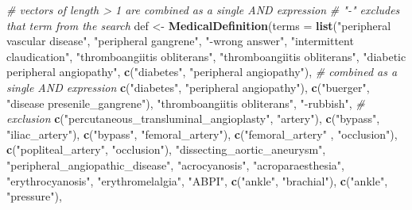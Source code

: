 \documentclass[]{article}
\newenvironment{Shaded}{\begin{snugshade}}{\end{snugshade}}
\newcommand{\KeywordTok}[1]{\textcolor[rgb]{0.13,0.29,0.53}{\textbf{{#1}}}}
\newcommand{\DataTypeTok}[1]{\textcolor[rgb]{0.13,0.29,0.53}{{#1}}}
\newcommand{\StringTok}[1]{\textcolor[rgb]{0.31,0.60,0.02}{{#1}}}
\newcommand{\CommentTok}[1]{\textcolor[rgb]{0.56,0.35,0.01}{\textit{{#1}}}}
\newcommand{\NormalTok}[1]{{#1}}
\begin{document}
\begin{Shaded}
\begin{Highlighting}[]
\CommentTok{# vectors of length > 1 are combined as a single AND expression}
\CommentTok{# "-" excludes that term from the search}
\NormalTok{def <-}\StringTok{ }\KeywordTok{MedicalDefinition}\NormalTok{(}\DataTypeTok{terms =} \KeywordTok{list}\NormalTok{(}\StringTok{"peripheral vascular disease"}\NormalTok{, }\StringTok{"peripheral gangrene"}\NormalTok{, }\StringTok{"-wrong answer"}\NormalTok{,}
                      \StringTok{"intermittent claudication"}\NormalTok{, }\StringTok{"thromboangiitis obliterans"}\NormalTok{,}
                      \StringTok{"thromboangiitis obliterans"}\NormalTok{, }\StringTok{"diabetic peripheral angiopathy"}\NormalTok{,}
                      \KeywordTok{c}\NormalTok{(}\StringTok{"diabetes"}\NormalTok{, }\StringTok{"peripheral angiopathy"}\NormalTok{),  }\CommentTok{# combined as a single AND expression}
                      \KeywordTok{c}\NormalTok{(}\StringTok{"diabetes"}\NormalTok{, }\StringTok{"peripheral angiopathy"}\NormalTok{),}
                      \KeywordTok{c}\NormalTok{(}\StringTok{"buerger"}\NormalTok{,  }\StringTok{"disease presenile_gangrene"}\NormalTok{),}
                      \StringTok{"thromboangiitis obliterans"}\NormalTok{,}
                      \StringTok{"-rubbish"}\NormalTok{, }\CommentTok{# exclusion}
                      \KeywordTok{c}\NormalTok{(}\StringTok{"percutaneous_transluminal_angioplasty"}\NormalTok{, }\StringTok{"artery"}\NormalTok{),}
                      \KeywordTok{c}\NormalTok{(}\StringTok{"bypass"}\NormalTok{, }\StringTok{"iliac_artery"}\NormalTok{),}
                      \KeywordTok{c}\NormalTok{(}\StringTok{"bypass"}\NormalTok{, }\StringTok{"femoral_artery"}\NormalTok{),}
                      \KeywordTok{c}\NormalTok{(}\StringTok{"femoral_artery"} \NormalTok{, }\StringTok{"occlusion"}\NormalTok{),}
                      \KeywordTok{c}\NormalTok{(}\StringTok{"popliteal_artery"}\NormalTok{, }\StringTok{"occlusion"}\NormalTok{),}
                      \StringTok{"dissecting_aortic_aneurysm"}\NormalTok{, }\StringTok{"peripheral_angiopathic_disease"}\NormalTok{,}
                      \StringTok{"acrocyanosis"}\NormalTok{, }\StringTok{"acroparaesthesia"}\NormalTok{, }\StringTok{"erythrocyanosis"}\NormalTok{,}
                      \StringTok{"erythromelalgia"}\NormalTok{, }\StringTok{"ABPI"}\NormalTok{,}
                      \KeywordTok{c}\NormalTok{(}\StringTok{"ankle"}\NormalTok{, }\StringTok{"brachial"}\NormalTok{),}
                      \KeywordTok{c}\NormalTok{(}\StringTok{"ankle"}\NormalTok{, }\StringTok{"pressure"}\NormalTok{),}

\end{Highlighting}
\end{Shaded}
\end{document}
